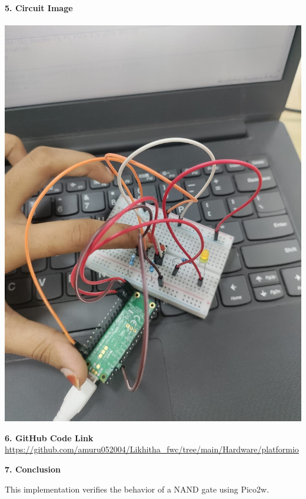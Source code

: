 \documentclass[12pt]{article}
\begin{document}
\vspace{19em}
\textbf{5. Circuit Image}\\ 
\\
\includegraphics[width=0.6\linewidth]{output.jpeg} 


\vspace{1em}
\noindent\textbf{6. GitHub Code Link} \\
\url{https://github.com/amuru052004/Likhitha_fwc/tree/main/Hardware/platformio}

\vspace{1em}
\noindent\textbf{7. Conclusion}

This implementation verifies the behavior of a NAND gate using  Pico2w. 
\end{document}
